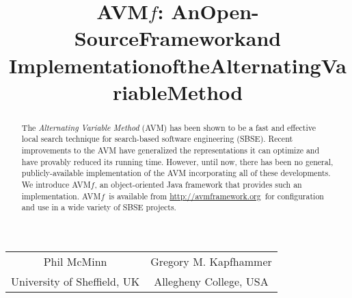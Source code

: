 \documentclass{llncs}
\newcommand{\AVM}{Alternating Variable Method\xspace}
\newcommand{\name}{\mbox{AVM\hspace{-1pt}$f$}\xspace}
\newcommand{\repourl}{\url{http://avmframework.org}\xspace}
\begin{document}
\title{\texorpdfstring{\name: An\:Open-Source\:Framework\:and\\$\!$$\!$$\!$Implementation\:of\:the\:Alternating\:Variable\:Method\vspace{-.75em}}{}}
\author{} %
\institute{} %
\maketitle

\vspace{-2em}
\begin{center}
\begin{tabular}{c@{\hskip 3em}c}
                Phil McMinn & Gregory M. Kapfhammer \\
                {\small University of Sheffield, UK} & {\small Allegheny College, USA} \\
\end{tabular}
\end{center}
\vspace{-2em}

\begin{abstract}
The {\it \AVM\/} (AVM) has been shown to be a fast and effective local search technique for %
search-based software engineering (SBSE).
%
Recent improvements to the AVM have generalized the
representations it can optimize and have provably reduced its running time.
However, until now, there has been no general, publicly-available
implementation of the AVM
incorporating
all of these developments.
We introduce \name, an object-oriented
Java framework
that provides
such an implementation. \name~is available from \repourl~for configuration and use in a wide variety of SBSE projects.\vspace{-1ex}
\end{abstract}

\vspace{-2.5em}
\end{document}
